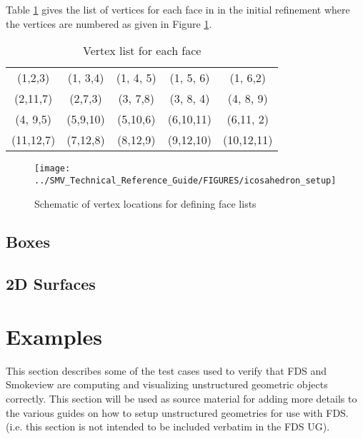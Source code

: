 \documentclass[12pt]{article}
\begin{document}
Table \ref{table:facelist} gives the list of vertices for each face in
in the initial refinement where the vertices are numbered as given  in
Figure \ref{figure:facelist}.
\begin{table}
\caption{Vertex list for each face}
\begin{center}
\begin{tabular}{ccccc}
  \hline
  (1,2,3)&   (1, 3,4)&  (1, 4, 5)&   (1, 5, 6)&   (1, 6,2)\\
  (2,11,7)&  (2,7,3)&   (3, 7,8)&  (3, 8, 4)&   (4, 8, 9)\\
  (4, 9,5)&  (5,9,10)&   (5,10,6)& (6,10,11)&   (6,11, 2)   \\
  (11,12,7)& (7,12,8)&   (8,12,9)&   (9,12,10)&   (10,12,11)   \\
  \hline
\end{tabular}
\end{center}
\label{table:facelist}
\end{table}

\begin{figure}[\figoptions]
\begin{center}
\texttt{[image: ../SMV\_Technical\_Reference\_Guide/FIGURES/icosahedron\_setup]}
\end{center}
\caption{Schematic of vertex locations for defining face lists}
\label{figure:facelist}
\end{figure}

\subsection{Boxes}
\subsection{2D Surfaces}

\section{Examples}
This section describes some of the test cases used to verify that FDS and Smokeview are computing
and visualizing unstructured geometric objects correctly.  This section will be used as source material for adding
more details to the various guides on how to setup unstructured geometries for use with FDS. (i.e. this section
is not intended to be included verbatim in the FDS UG).

\newcommand{\geominput}[1]{{\scriptsize}}
\newcommand{\figheightD}{2.75in}
\end{document}
